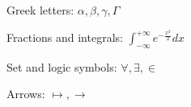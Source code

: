 \documentclass[a4paper]{article}
\begin{document}

Greek letters: $\alpha,  \beta, \gamma, \Gamma$

Fractions and integrals: $\int_{-\infty}^{+\infty} e^{ -\frac{x^2}{2}} dx$

Set and logic symbols: $\forall, \exists, \in$

Arrows: $\mapsto, \rightarrow$
\end{document}
